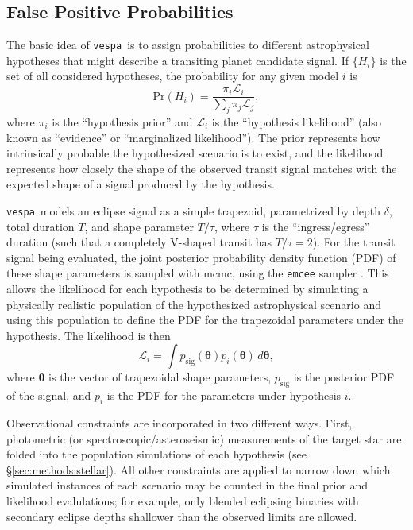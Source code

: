 \documentclass[preprint2]{aastex}
\newcommand{\vespa}{\texttt{vespa}}
\newcommand{\bvec}[1]{{\ensuremath{\boldsymbol{#1}}}}
\begin{document}

\subsection{False Positive Probabilities}
\label{sec:methods:fpp}

The basic idea of \vespa\ is to assign probabilities to different
astrophysical hypotheses that might describe a transiting planet
candidate signal.  If $\{H_i\}$ is the set of all considered
hypotheses, the probability for any given model $i$ is
\begin{equation}
  \label{eq:prob}
  \mathrm{Pr}\left(H_i\right) = \frac{\pi_i \mathcal
    L_i}{\displaystyle \sum_j \pi_j \mathcal L_j},
\end{equation}
where $\pi_i$ is the ``hypothesis prior'' and $\mathcal L_i$ is the
``hypothesis likelihood'' (also known as ``evidence'' or
``marginalized likelihood'').  The prior represents how intrinsically
probable the hypothesized scenario is to exist, and the likelihood
represents how closely the shape of the observed transit signal
matches with the expected shape of a signal produced by the
hypothesis.

\vespa\ models an eclipse signal as a simple trapezoid, parametrized
by depth $\delta$, total duration $T$, and shape parameter $T / \tau$,
where $\tau$ is the ``ingress/egress'' duration (such that a
completely V-shaped transit has $T/\tau = 2$).  For the transit signal
being evaluated, the joint posterior probability density function
(PDF) of these shape parameters is sampled with \ac{mcmc}, using the
\texttt{emcee} sampler \citep{emcee}.  This allows the likelihood for
each hypothesis to be determined by simulating a physically realistic
population of the hypothesized astrophysical scenario and using this
population to define the PDF for the trapezoidal parameters under the
hypothesis.  The likelihood is then
\begin{equation}
  \label{eq:lhood}
  \mathcal L_i = \displaystyle \int p_\mathrm{sig}\left(\bvec{\theta}\right)
                                    p_i\left(\bvec{\theta}\right)\,d\bvec{\theta},
\end{equation}
where $\bvec{\theta}$ is the vector of trapezoidal shape parameters,
$p_\mathrm{sig}$ is the posterior PDF of the signal, and $p_i$ is the
PDF for the parameters under hypothesis $i$.

Observational constraints are incorporated in two different ways.
First, photometric (or spectroscopic/asteroseismic) measurements of
the target star are folded into the population simulations of each
hypothesis (see \S\ref{sec:methods:stellar}).  All other constraints are
applied to narrow down which simulated instances of each scenario may
be counted in the final prior and likelihood evalulations; for example,
only blended eclipsing binaries with secondary eclipse depths
shallower than the observed limits are allowed.
\end{document}
